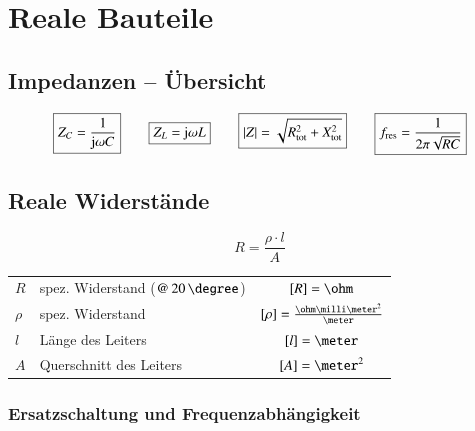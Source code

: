 \section{Reale Bauteile}

\subsection{Impedanzen -- Übersicht}

$$ \boxed{ Z_C = \frac{1}{\mathrm{j} \omega C} } 
    \qquad \boxed{ Z_L = \mathrm{j} \omega L } 
    \qquad \boxed{ |Z| = \sqrt{R_{\rm tot}^2 + X_{\rm tot}^2 } }
    \qquad \boxed{ f_{\rm res} = \frac{1}{2 \pi \sqrt{ R C} } } $$


\subsection{Reale Widerstände}

\begin{minipage}[c]{0.20\columnwidth}
    $$ \boxed{R = \frac{\rho \cdot l}{A}} $$
\end{minipage}
\hfill
\begin{minipage}[c]{0.78\columnwidth}
    \begin{tabular}{llc}
        $R$     & spez. Widerstand ($@ \, 20 \, \degree$)   & $[R] = \ohm$ \\
        $\rho$  & spez. Widerstand                          & $[\rho] = \frac{\ohm \milli \meter^2}{\meter}$ \\
        $l$     & Länge des Leiters                         & $[l] = \meter$ \\
        $A$     & Querschnitt des Leiters                   & $[A] = \meter^2$
    \end{tabular}
\end{minipage}


\subsubsection{Ersatzschaltung und Frequenzabhängigkeit}

